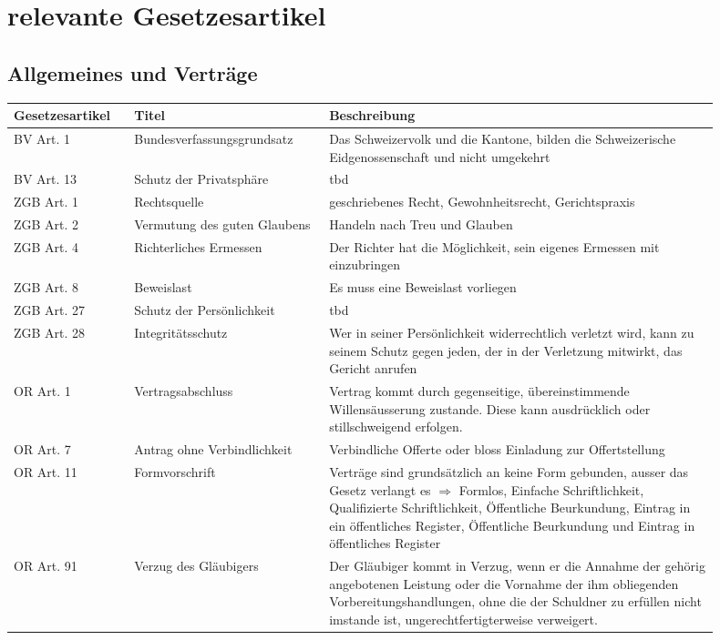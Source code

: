 \documentclass{report}
\theoremstyle{definition}
\theoremstyle{example}
\begin{document}
\chapter{relevante Gesetzesartikel}

\section{Allgemeines und Verträge}
\begin{tabular}[h]{p{0.15\linewidth}|p{0.25\linewidth}|p{0.50\linewidth}}
   \textbf{Gesetzesartikel} & \textbf{Titel} & \textbf{Beschreibung} \\
   \hline
   BV Art. 1 & Bundesverfassungsgrundsatz & Das Schweizervolk und die Kantone, bilden die Schweizerische Eidgenossenschaft und nicht umgekehrt\\
   \hline
   BV Art. 13 & Schutz der Privatsphäre & tbd \\
   \hline
   ZGB Art. 1 & Rechtsquelle & geschriebenes Recht, Gewohnheitsrecht, Gerichtspraxis\\
   \hline
   ZGB Art. 2 & Vermutung des guten Glaubens & Handeln nach Treu und Glauben\\
   \hline
   ZGB Art. 4 & Richterliches Ermessen & Der Richter hat die Möglichkeit, sein eigenes Ermessen mit einzubringen\\
   \hline
   ZGB Art. 8 & Beweislast & Es muss eine Beweislast vorliegen\\
   \hline
   ZGB Art. 27 & Schutz der Persönlichkeit & tbd \\
   \hline
   ZGB Art. 28 & Integritätsschutz & Wer in seiner Persönlichkeit widerrechtlich verletzt wird, kann zu seinem Schutz gegen jeden, der in der Verletzung mitwirkt, das Gericht anrufen \\
   \hline
   OR Art. 1 & Vertragsabschluss & Vertrag kommt durch gegenseitige, übereinstimmende Willensäusserung zustande. Diese kann ausdrücklich oder stillschweigend erfolgen.\\
   \hline
   OR Art. 7 & Antrag ohne Verbindlichkeit & Verbindliche Offerte oder bloss Einladung zur Offertstellung \\
   \hline
   OR Art. 11 & Formvorschrift & Verträge sind grundsätzlich an keine Form gebunden, ausser das Gesetz verlangt es $\Rightarrow$ Formlos, Einfache Schriftlichkeit, Qualifizierte Schriftlichkeit, Öffentliche Beurkundung, Eintrag in ein öffentliches Register, Öffentliche Beurkundung und Eintrag in öffentliches Register \\
   \hline
   OR Art. 91 & Verzug des Gläubigers & Der Gläubiger kommt in Verzug, wenn er die Annahme der gehörig angebotenen Leistung oder die Vornahme der ihm obliegenden Vorbereitungshandlungen, ohne die der Schuldner zu erfüllen nicht imstande ist, ungerechtfertigterweise verweigert. \\

\end{tabular}
\end{document}
